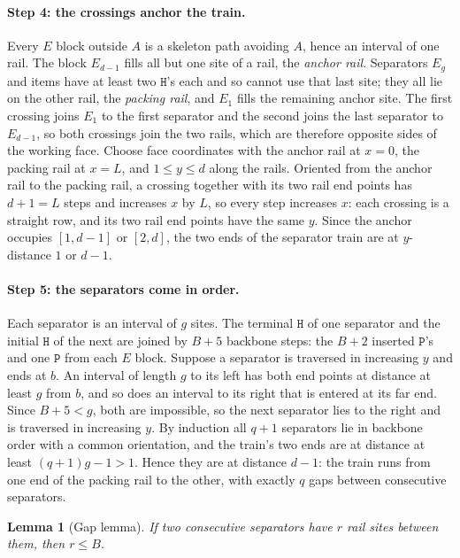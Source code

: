 \documentclass[11pt,letterpaper]{article}
\newtheorem{lemma}[theorem]{Lemma}
\theoremstyle{definition}
\theoremstyle{remark}
\newcommand{\Hh}{\mathtt{H}}
\newcommand{\Pp}{\mathtt{P}}
\begin{document}
\paragraph{Step 4: the crossings anchor the train.}
Every $E$ block outside $A$ is a skeleton path avoiding $A$, hence an interval of one rail. The block
$E_{d-1}$ fills all but one site of a rail, the \emph{anchor rail}. Separators $E_g$ and items have at
least two $\Hh$'s each and so cannot use that last site; they all lie on the other rail, the
\emph{packing rail}, and $E_1$ fills the remaining anchor site. The first crossing joins $E_1$ to the
first separator and the second joins the last separator to $E_{d-1}$, so both crossings join the two
rails, which are therefore opposite sides of the working face. Choose face coordinates with the
anchor rail at $x=0$, the packing rail at $x=L$, and $1\le y\le d$ along the rails. Oriented from the
anchor rail to the packing rail, a crossing together with its two rail end points has $d+1=L$ steps
and increases $x$ by $L$, so every step increases $x$: each crossing is a straight row, and its two
rail end points have the same $y$. Since the anchor occupies $[1,d-1]$ or $[2,d]$, the two ends of
the separator train are at $y$-distance $1$ or $d-1$.

\paragraph{Step 5: the separators come in order.}
Each separator is an interval of $g$ sites. The terminal $\Hh$ of one separator and the initial $\Hh$
of the next are joined by $B+5$ backbone steps: the $B+2$ inserted $\Pp$'s and one $\Pp$ from each $E$
block. Suppose a separator is traversed in increasing $y$ and ends at $b$. An interval of length $g$
to its left has both end points at distance at least $g$ from $b$, and so does an interval to its
right that is entered at its far end. Since $B+5<g$, both are impossible, so the next separator lies
to the right and is traversed in increasing $y$. By induction all $q+1$ separators lie in backbone
order with a common orientation, and the train's two ends are at distance at least $(q+1)g-1>1$.
Hence they are at distance $d-1$: the train runs from one end of the packing rail to the other, with exactly
$q$ gaps between consecutive separators.

\begin{lemma}[Gap lemma]\label{lem:gap}
If two consecutive separators have $r$ rail sites between them, then $r\le B$.
\end{lemma}
\end{document}
